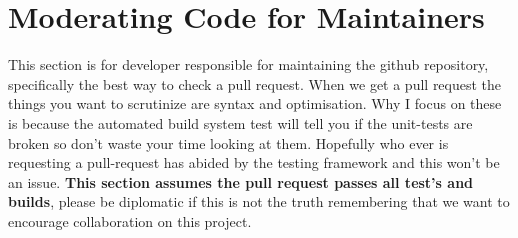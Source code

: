 \section{Moderating Code for Maintainers\label{sec:Maintaining}}

This section is for developer responsible for maintaining the github repository, specifically the best way to check a pull request. When we get a pull request the things you want to scrutinize are syntax and optimisation. Why I focus on these is because the automated build system test will tell you if the unit-tests are broken so don't waste your time looking at them. Hopefully who ever is requesting a pull-request has abided by the testing framework and this won't be an issue. \textbf{This section assumes the pull request passes all test's and builds}, please be diplomatic if this is not the truth remembering that we want to encourage collaboration on this project.


